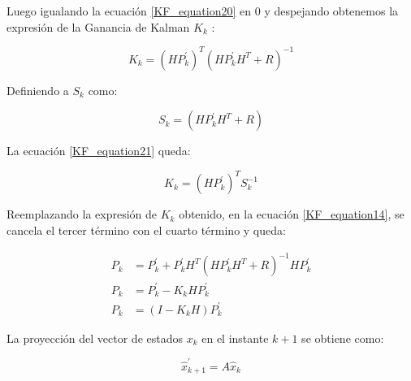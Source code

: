 \documentclass[10pt,a4paper]{article}
\begin{document}
	Luego igualando la ecuación \ref{KF_equation20} en 0 y despejando obtenemos la expresión de la Ganancia de Kalman $K_k$ :
	
	\begin{figure}[h!]
		\begin{center}
			\begin{equation}
				K_k = (H P^\prime_k)^T (H P^\prime_k H^T + R)^{-1} 
				\label{KF_equation21}
			\end{equation}	
		\end{center}
	\end{figure}
	
	\clearpage
	
	Definiendo a $S_k$ como:
	
	\begin{figure}[h!]
		\begin{center}
			\begin{equation}
				S_k = (H P^\prime_k H^T + R)
				\label{KF_equation22}
			\end{equation}	
		\end{center}
	\end{figure}
	
	La ecuación \ref{KF_equation21} queda:
	
	\begin{figure}[h!]
		\begin{center}
			\begin{equation}
				K_k = (H P^\prime_k)^T S_k^{-1} 
				\label{K_Gain}
			\end{equation}	
		\end{center}
	\end{figure}
	
	Reemplazando la expresión de $K_k$ obtenido, en la ecuación  \ref{KF_equation14}, se cancela el tercer término con el cuarto término y queda:
	
	\begin{align}
		P_k  &= P^\prime_k + P^\prime_k H^T (H P^\prime_k H^T + R)^{-1} H P^\prime_k \nonumber \\
		P_k  &= P^\prime_k - K_k H P^\prime_k \nonumber\\
		P_k  &= (I - K_k H) P^\prime_k	
		\label{KF_equation23}	
	\end{align}
	
	La proyección del vector de estados $x_k$ en el instante $k+1$ se obtiene como:
	
	\begin{figure}[h!]
		\begin{center}
			\begin{equation}
				\hat{x}^\prime_{k+1} = A \hat{x}_k 
				\label{x_k_projection}
			\end{equation}	
		\end{center}
	\end{figure}
	
\end{document}
